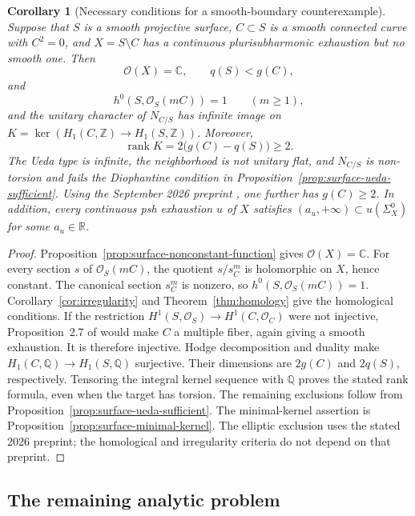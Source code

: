 \documentclass[11pt]{amsart}
\newtheorem{corollary}[theorem]{Corollary}
\theoremstyle{definition}
\theoremstyle{remark}
\numberwithin{equation}{section}
\newcommand{\C}{\mathbb C}
\newcommand{\R}{\mathbb R}
\newcommand{\OO}{\mathcal O}
\begin{document}
\begin{corollary}[Necessary conditions for a smooth-boundary counterexample]
\label{cor:surface-residual-homology}
Suppose that $S$ is a smooth projective surface, $C\subset S$ is a smooth connected curve
with $C^2=0$, and $X=S\setminus C$ has a continuous plurisubharmonic exhaustion but no
smooth one. Then
\[
 \OO(X)=\C,\qquad q(S)<g(C),
\]
and
\[
 h^0(S,\OO_S(mC))=1\qquad(m\ge1),
\]
and the unitary character of $N_{C/S}$ has infinite image on
$K=\ker(H_1(C,\mathbb Z)\to H_1(S,\mathbb Z))$. Moreover,
\[
 \operatorname{rank}K=2\bigl(g(C)-q(S)\bigr)\ge2.
\]
The Ueda type is infinite, the neighborhood is not unitary flat, and $N_{C/S}$ is
non-torsion and fails the Diophantine condition in
Proposition~\ref{prop:surface-ueda-sufficient}. Using the September 2026 preprint
\cite[Theorem 1.6]{CFSTZ2026}, one further has $g(C)\ge2$.
In addition, every continuous psh exhaustion $u$ of $X$ satisfies
$(a_u,+\infty)\subset u(\Sigma_X^0)$ for some $a_u\in\R$.
\end{corollary}
\begin{proof}
Proposition~\ref{prop:surface-nonconstant-function} gives $\OO(X)=\C$. For every section $s$
of $\OO_S(mC)$, the quotient $s/s_C^m$ is holomorphic on $X$, hence constant. The canonical
section $s_C^m$ is nonzero, so $h^0(S,\OO_S(mC))=1$. Corollary~\ref{cor:irregularity} and
Theorem~\ref{thm:homology} give the homological conditions. If the restriction
$H^1(S,\OO_S)\to H^1(C,\OO_C)$ were not injective, Proposition~2.7 of \cite{CLPT2018} would
make $C$ a multiple fiber, again giving a smooth exhaustion. It is therefore injective.
Hodge decomposition and duality make $H_1(C,\mathbb Q)\to H_1(S,\mathbb Q)$ surjective.
Their dimensions are $2g(C)$ and $2q(S)$, respectively. Tensoring the integral kernel
sequence with $\mathbb Q$ proves the stated rank formula, even when the target has torsion.
The remaining exclusions follow from Proposition~\ref{prop:surface-ueda-sufficient}. The
minimal-kernel assertion is
Proposition~\ref{prop:surface-minimal-kernel}. The elliptic exclusion
uses the stated 2026 preprint; the homological and irregularity criteria
do not depend on that preprint.
\end{proof}


\subsection{The remaining analytic problem}
\end{document}
